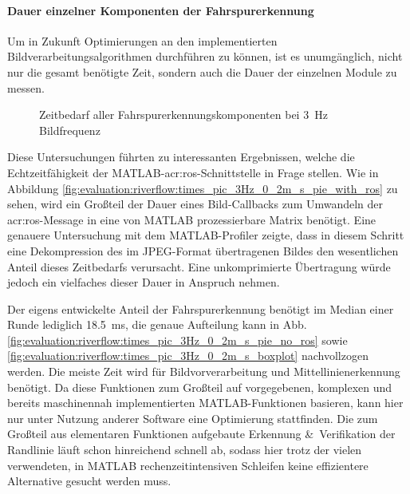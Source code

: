 \paragraph{Dauer einzelner Komponenten der Fahrspurerkennung}
Um in Zukunft Optimierungen an den implementierten Bildverarbeitungsalgorithmen durchführen zu können, ist es unumgänglich, nicht nur die gesamt benötigte Zeit, sondern auch die Dauer der einzelnen Module zu messen.

\begin{figure}[htbp] %
\centering
{}
\hfill	
{}
\hfill
\caption{Zeitbedarf aller Fahrspurerkennungskomponenten bei \SI{3}{\hertz} Bildfrequenz}
\end{figure}

Diese Untersuchungen führten zu interessanten Ergebnissen, welche die Echtzeitfähigkeit der MATLAB-\gls{acr:ros}-Schnittstelle in Frage stellen. Wie in Abbildung \ref{fig:evaluation:riverflow:times_pic_3Hz_0_2m_s_pie_with_ros} zu sehen, wird ein Großteil der Dauer eines Bild-Callbacks zum Umwandeln der \gls{acr:ros}-Message in eine von MATLAB prozessierbare Matrix benötigt. Eine genauere Untersuchung mit dem MATLAB-Profiler zeigte, dass in diesem Schritt eine Dekompression des im JPEG-Format übertragenen Bildes den wesentlichen Anteil dieses Zeitbedarfs verursacht. Eine unkomprimierte Übertragung würde jedoch ein vielfaches dieser Dauer in Anspruch nehmen.

Der eigens entwickelte Anteil der Fahrspurerkennung benötigt im Median einer Runde lediglich \SI{18,5}{ms}, die genaue Aufteilung kann in Abb. \ref{fig:evaluation:riverflow:times_pic_3Hz_0_2m_s_pie_no_ros} sowie \ref{fig:evaluation:riverflow:times_pic_3Hz_0_2m_s_boxplot} nachvollzogen werden. Die meiste Zeit wird für Bildvorverarbeitung und Mittellinienerkennung benötigt. Da diese Funktionen zum Großteil auf vorgegebenen, komplexen und bereits maschinennah implementierten MATLAB-Funktionen basieren, kann hier nur unter Nutzung anderer Software eine Optimierung stattfinden. Die zum Großteil aus elementaren Funktionen aufgebaute Erkennung \&\ Verifikation der Randlinie läuft schon hinreichend schnell ab, sodass hier trotz der vielen verwendeten, in MATLAB rechenzeitintensiven Schleifen keine effizientere Alternative gesucht werden muss.

